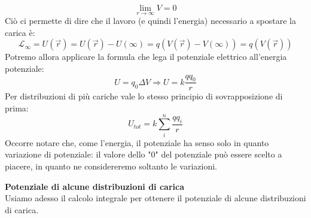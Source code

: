 \documentclass[a4paper,12pt]{article}
\begin{document}
$$ \lim_{r\rightarrow \infty} V = 0 $$
Ciò ci permette di dire che il lavoro (e quindi l'energia) necessario a spostare la carica è:
$$ \mathcal{L}_{\infty} = U(\vec{r}) = U(\vec{r}) - U(\infty)= q(V(\vec{r}) - V(\infty)) = q(V(\vec{r}))$$
Potremo allora applicare la formula che lega il potenziale elettrico all'energia potenziale:
$$ U = q_0\Delta V \Rightarrow U = k\frac{qq_0}{r} $$
Per distribuzioni di più cariche vale lo stesso principio di sovrapposizione di prima:
$$ U_{tot} = k\sum_i^n \frac{qq_i}{r} $$
Occorre notare che, come l'energia, il potenziale ha senso solo in quanto variazione di potenziale: il valore dello "0" del potenziale può essere scelto a piacere, in quanto ne considereremo soltanto le variazioni.
\par\smallskip
\textbf{Potenziale di alcune distribuzioni di carica} \\
Usiamo adesso il calcolo integrale per ottenere il potenziale di alcune distribuzioni di carica.
\end{document}
